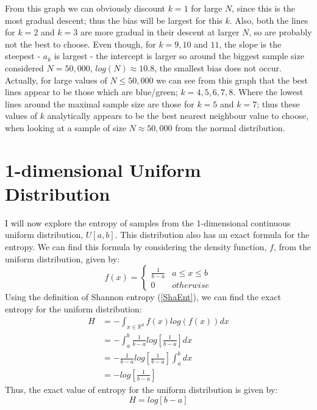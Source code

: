 \documentclass[12pt]{report}
\begin{document}
From this graph we can obviously discount $k=1$ for large $N$, since this is the most gradual descent; thus the bias will be largest for this $k$. Also, both the lines for $k=2$ and $k=3$ are more gradual in their descent at larger $N$, so are probably not the best to choose. Even though, for $k=9, 10$ and $11$, the slope is the steepest - $a_{k}$ is largest - the intercept is larger so around the biggest sample size considered $N=50,000$, $log(N) \approx 10.8$, the smallest bias does not occur. Actually, for large values of $N \leq 50,000$ we can see from this graph that the best lines appear to be those which are blue/green; $k = 4, 5, 6, 7, 8$. Where the lowest lines around the maximal sample size are those for $k=5$ and $k=7$; thus these values of $k$ analytically appears to be the best nearest neighbour value to choose, when looking at a sample of size $N \approx 50,000$ from the normal distribution.











\section{1-dimensional Uniform Distribution} \label{Uniform_d=1}

I will now explore the entropy of samples from the 1-dimensional continuous uniform distribution, $U[a, b]$. This distribution also has an exact formula for the entropy. We can find this formula by considering the density function, $f$, from the uniform distribution, given by:
\[
f(x) =  \begin{cases} 
      \frac{1}{b-a} & a \leq x \leq b \\
      0 & otherwise
   \end{cases}
\]
Using the definition of Shannon entropy (\ref{ShaEnt}), we can find the exact entropy for the uniform distribution:
\begin{align*}
H &= - \int_{x \in \mathbb{R}^d} f(x) log(f(x)) dx \\ 
&= - \int_{a}^{b} \frac{1}{b-a} log \left[ \frac{1}{b-a} \right] dx  \\
&= - \frac{1}{b-a} log \left[ \frac{1}{b-a} \right]  \int_{a}^{b} dx  \\
&= -  log  \left[ \frac{1}{b-a} \right] 
\end{align*}
Thus, the exact value of entropy for the uniform distribution is given by:
\begin{equation} \label{UnifEnt}
H = log [ b-a ]
\end{equation}
\end{document}
